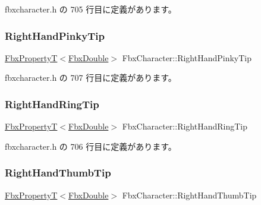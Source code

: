  fbxcharacter.\+h の 705 行目に定義があります。

\mbox{\label{class_fbx_character_ae79ccd7cb9a3a5acb720b1ef6bda77c4}} 
\subsubsection{\texorpdfstring{Right\+Hand\+Pinky\+Tip}{RightHandPinkyTip}}
{\footnotesize\ttfamily \hyperlink{class_fbx_property_t}{Fbx\+PropertyT}$<$\hyperlink{fbxtypes_8h_a171e72a1c46fc15c1a6c9c31948c1c5b}{Fbx\+Double}$>$ Fbx\+Character\+::\+Right\+Hand\+Pinky\+Tip}



 fbxcharacter.\+h の 707 行目に定義があります。

\mbox{\label{class_fbx_character_ad548a4a5905ff45181d63479017ed12a}} 
\subsubsection{\texorpdfstring{Right\+Hand\+Ring\+Tip}{RightHandRingTip}}
{\footnotesize\ttfamily \hyperlink{class_fbx_property_t}{Fbx\+PropertyT}$<$\hyperlink{fbxtypes_8h_a171e72a1c46fc15c1a6c9c31948c1c5b}{Fbx\+Double}$>$ Fbx\+Character\+::\+Right\+Hand\+Ring\+Tip}



 fbxcharacter.\+h の 706 行目に定義があります。

\mbox{\label{class_fbx_character_a9f4c954aa28a467e6ff84c2a596b308c}} 
\subsubsection{\texorpdfstring{Right\+Hand\+Thumb\+Tip}{RightHandThumbTip}}
{\footnotesize\ttfamily \hyperlink{class_fbx_property_t}{Fbx\+PropertyT}$<$\hyperlink{fbxtypes_8h_a171e72a1c46fc15c1a6c9c31948c1c5b}{Fbx\+Double}$>$ Fbx\+Character\+::\+Right\+Hand\+Thumb\+Tip}



